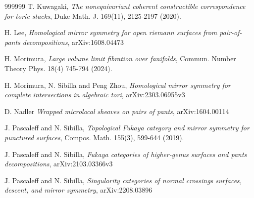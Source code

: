 \documentclass[a4paper,12pt, twoside, pdftex]{amsart}
\theoremstyle{definition}
\numberwithin{equation}{section}
\begin{document}
\begin{thebibliography}{999999}
T. Kuwagaki,
\emph{The nonequivariant coherent constructible correspondence for toric stacks},
Duke Math. J. 169(11), 2125-2197 (2020).

H. Lee,
\emph{Homological mirror symmetry for open riemann surfaces from pair-of-pants decompositions},
arXiv:1608.04473

H. Morimura,
\emph{Large volume limit fibration over fanifolds},
Commun. Number Theory Phys. 18(4) 745-794 (2024).

H. Morimura, N. Sibilla and Peng Zhou,
\emph{Homological mirror symmetry for complete intersections in algebraic tori},
arXiv:2303.06955v3

D. Nadler
\emph{Wrapped microlocal sheaves on pairs of pants},
arXiv:1604.00114

J. Pascaleff and N. Sibilla,
\emph{Topological Fukaya category and mirror symmetry for punctured surfaces},
Compos. Math. 155(3), 599-644 (2019).

J. Pascaleff and N. Sibilla,
\emph{Fukaya categories of higher-genus surfaces and pants decompositions},
arXiv:2103.03366v3 

J. Pascaleff and N. Sibilla,
\emph{Singularity categories of normal crossings surfaces, descent, and mirror symmetry},
arXiv:2208.03896
\end{thebibliography}
\end{document}
